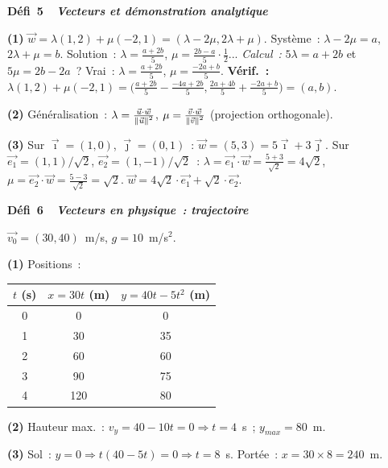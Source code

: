 \noindent{}
{\color{BO}\bfseries\small D\'efi~5~\textendash\ \textit{Vecteurs et d\'emonstration analytique}}
\par\smallskip

\textbf{(1)} $\vec{w}=\lambda(1,2)+\mu(-2,1)=(\lambda-2\mu,2\lambda+\mu)$.
Syst\`eme~: $\lambda-2\mu=a$, $2\lambda+\mu=b$.
Solution~: $\lambda=\frac{a+2b}{5}$, $\mu=\frac{2b-a}{5}\cdot\frac{1}{2}$...
\emph{Calcul~:} $5\lambda=a+2b$ et $5\mu=2b-2a$~?
Vrai~: $\lambda=\frac{a+2b}{5}$, $\mu=\frac{-2a+b}{5}$.
\textbf{V\'erif.~:} $\lambda(1,2)+\mu(-2,1)=\bigl(\frac{a+2b}{5}-\frac{-4a+2b}{5},\frac{2a+4b}{5}+\frac{-2a+b}{5}\bigr)=(a,b)$.\checkmark

\textbf{(2)} G\'en\'eralisation~: $\lambda=\frac{\vec{u}\cdot\vec{w}}{\left\|\vec{u}\right\|^2}$,
$\mu=\frac{\vec{v}\cdot\vec{w}}{\left\|\vec{v}\right\|^2}$ (projection orthogonale).

\textbf{(3)} Sur $\vec{\imath}=(1,0)$, $\vec{\jmath}=(0,1)$~:
$\vec{w}=(5,3)=5\vec{\imath}+3\vec{\jmath}$.
Sur $\vec{e_1}=(1,1)/\sqrt{2}$, $\vec{e_2}=(1,-1)/\sqrt{2}$~:
$\lambda=\vec{e_1}\cdot\vec{w}=\frac{5+3}{\sqrt{2}}=4\sqrt{2}$,
$\mu=\vec{e_2}\cdot\vec{w}=\frac{5-3}{\sqrt{2}}=\sqrt{2}$.
$\vec{w}=4\sqrt{2}\cdot\vec{e_1}+\sqrt{2}\cdot\vec{e_2}$.\checkmark

\noindent{}
{\color{BO}\bfseries\small D\'efi~6~\textendash\ \textit{Vecteurs en physique~: trajectoire}}
\par\smallskip

$\vec{v_0}=(30,40)$~m/s, $g=10$~m/s$^2$.

\textbf{(1)} Positions~:
\begin{center}
\begin{tabular}{c|cc}
$t$ (s) & $x=30t$ (m) & $y=40t-5t^2$ (m) \\\hline
0 & 0 & 0 \\ 1 & 30 & 35 \\ 2 & 60 & 60 \\ 3 & 90 & 75 \\ 4 & 120 & 80
\end{tabular}
\end{center}

\textbf{(2)} Hauteur max.~: $v_y=40-10t=0\Rightarrow t=4$~s~; $y_{max}=80$~m.

\textbf{(3)} Sol~: $y=0\Rightarrow t(40-5t)=0\Rightarrow t=8$~s.
Port\'ee~: $x=30\times8=240$~m.

